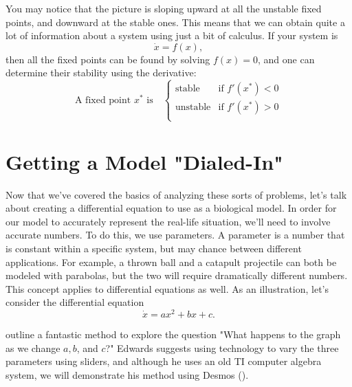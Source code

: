 \documentclass[man, 12pt]{apa6}
\newcommand{\citep}[1]{(\cite{#1})}
\begin{document}
You may notice that the picture is sloping upward at all the unstable fixed points, and downward at the stable ones. This means that we can obtain quite a lot of information about a system using just a bit of calculus. If your system is 
$$\dot{x}=f(x),$$
then all the fixed points can be found by solving $f(x)=0$, and one can determine their stability using the derivative:
\[\text{A fixed point } x^* \text{ is} \quad
\begin{cases}
\text{stable} & \text{if } f'(x^*)<0\\
\text{unstable} & \text{if } f'(x^*)>0\\
\end{cases}
\]

\section{Getting a Model "Dialed-In"}


Now that we've covered the basics of analyzing these sorts of problems, let's talk about creating a differential equation to use as a biological model. In order for our model to accurately represent the real-life situation, we'll need to involve accurate numbers. To do this, we use parameters. A parameter is a number that is constant within a specific system, but may chance between different applications. For example, a thrown ball and a catapult projectile can both be modeled with parabolas, but the two will require dramatically different numbers. This concept applies to differential equations as well. As an illustration, let's consider the differential equation
\begin{equation}
\dot{x}=ax^2+bx+c.
\end{equation}

\cite{edwards_2009} outline a fantastic method to explore the question "What happens to the graph as we change $a, b$, and $c$?" Edwards suggests using technology to vary the three parameters using sliders, and although he uses an old TI computer algebra system, we will demonstrate his method using Desmos \citep{desmos}. 
\end{document}
